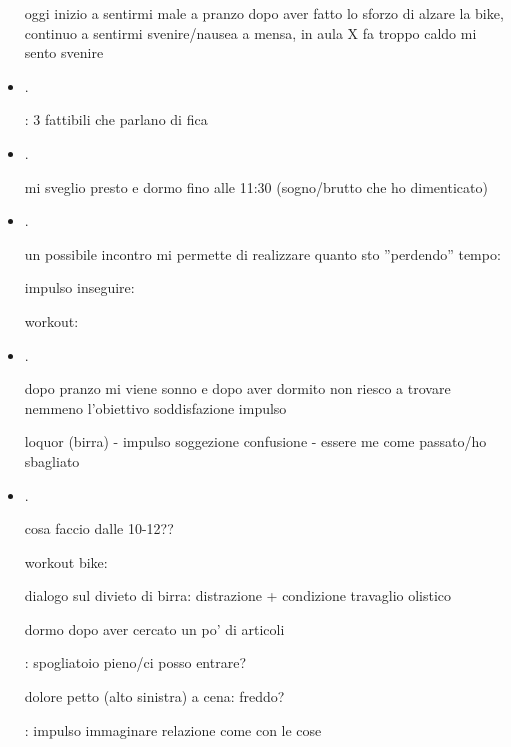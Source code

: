 \begin{itemize}
oggi inizio a sentirmi male a pranzo dopo aver fatto lo sforzo di alzare la bike, continuo a sentirmi svenire/nausea a mensa, in aula X fa troppo caldo mi sento svenire

\item {}.

: 3 fattibili che parlano di fica

\item {}.

mi sveglio presto e dormo fino alle 11:30 (sogno/brutto che ho dimenticato)



\item {}.

un possibile incontro mi permette di realizzare quanto sto ''perdendo'' tempo: 

impulso inseguire: 

workout: 

\item {}.


dopo pranzo mi viene sonno e dopo aver dormito non riesco a trovare nemmeno l'obiettivo soddisfazione impulso

loquor (birra) - impulso soggezione confusione - essere me come passato/ho sbagliato

\item {}.

cosa faccio dalle 10-12??

workout bike: 

dialogo sul divieto di birra: distrazione + condizione travaglio olistico

dormo dopo aver cercato un po' di articoli 

: spogliatoio pieno/ci posso entrare?

dolore petto (alto sinistra) a cena: freddo?

: impulso immaginare relazione come con le cose


\end{itemize}
